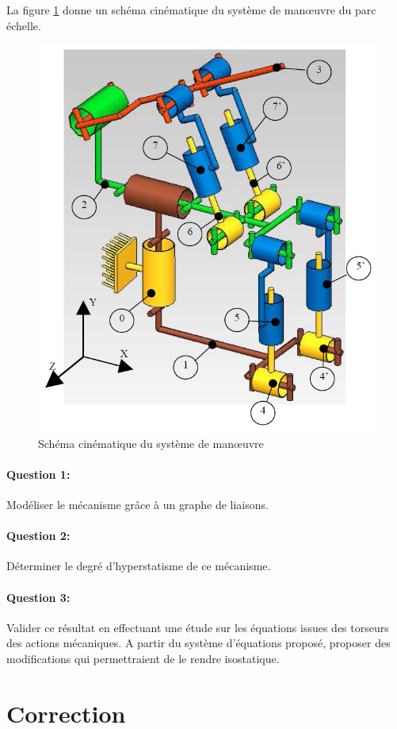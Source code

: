 La figure \ref{fig:image2} donne un schéma cinématique du système de man\oe uvre du parc échelle.

\begin{figure}[htbp]
\begin{center}
\includegraphics[width=0.4\linewidth]{img/epas_hyp.png}
\caption{Schéma cinématique du système de man\oe uvre}
\label{fig:image2}
\end{center}
\end{figure}

\paragraph{Question 1:}

Modéliser le mécanisme grâce à un graphe de liaisons.

\paragraph{Question 2:}

Déterminer le degré d'hyperstatisme de ce mécanisme.

\paragraph{Question 3:}

Valider ce résultat en effectuant une étude sur les équations issues des torseurs des actions mécaniques. A partir du système d'équations proposé, proposer des modifications qui permettraient de le rendre isostatique.

\clearpage

\ifdef{\public}{}{}

\newpage

\pagestyle{correction}\setcounter{section}{0}

\section{Correction}

